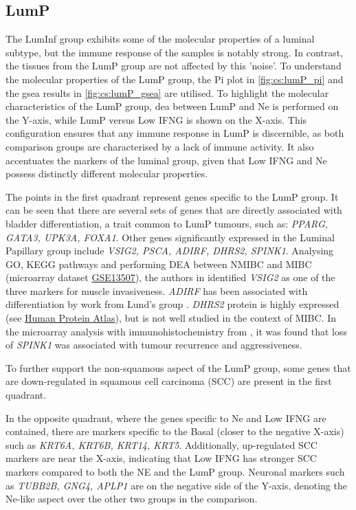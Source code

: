 \subsection{LumP} \label{s:cs:lumP_interp}

The LumInf group exhibits some of the molecular properties of a luminal subtype, but the immune response of the samples is notably strong. In contrast, the tissues from the LumP group are not affected by this 'noise'. To understand the molecular properties of the LumP group, the Pi plot in \cref{fig:cs:lumP_pi} and the \acrshort{gsea} results in \cref{fig:cs:lumP_gsea} are utilised. To highlight the molecular characteristics of the LumP group, \acrshort{dea} between LumP and Ne is performed on the Y-axis, while LumP versus Low IFNG is shown on the X-axis. This configuration ensures that any immune response in LumP is discernible, as both comparison groups are characterised by a lack of immune activity. It also accentuates the markers of the luminal group, given that Low IFNG and Ne possess distinctly different molecular properties.

The points in the first quadrant represent genes specific to the LumP group. It can be seen that there are several sets of genes that are directly associated with bladder differentiation, a trait common to LumP tumours, such as: \textit{PPARG, GATA3, UPK3A, FOXA1}. Other genes significantly expressed in the Luminal Papillary group include \textit{VSIG2, PSCA, ADIRF, DHRS2, SPINK1}. Analysing GO, KEGG pathways and performing DEA between NMIBC and MIBC (microarray dataset \href{https://www.ncbi.nlm.nih.gov/geo/query/acc.cgi?acc=GSE13507}{GSE13507}), the authors in \citet{He2021-de} identified \textit{VSIG2} as one of the three markers for muscle invasiveness. \textit{ADIRF} has been associated with differentiation by work from Lund's group \citet{Eriksson2015-lt}. \textit{DHRS2} protein is highly expressed (see \href{https://www.proteinatlas.org/ENSG00000100867-DHRS2/tissue/urinary+bladder}{Human Protein Atlas}), but is not well studied in the context of MIBC. In the microarray analysis with immunohistochemistry from \citet{Rink2013-sv}, it was found that loss of \textit{SPINK1} was associated with tumour recurrence and aggressiveness.

To further support the non-squamous aspect of the LumP group, some genes that are down-regulated in squamous cell carcinoma (SCC) \citet{Knowles2015-mu} are present in the first quadrant.

In the opposite quadrant, where the genes specific to Ne and Low IFNG are contained, there are markers specific to the Basal (closer to the negative X-axis) such as \textit{KRT6A, KRT6B, KRT14, KRT5}. Additionally, up-regulated SCC markers are near the X-axis, indicating that Low IFNG has stronger SCC markers compared to both the NE and the LumP group. Neuronal markers such as \textit{TUBB2B, GNG4, APLP1} are on the negative side of the Y-axis, denoting the Ne-like aspect over the other two groups in the comparison.

